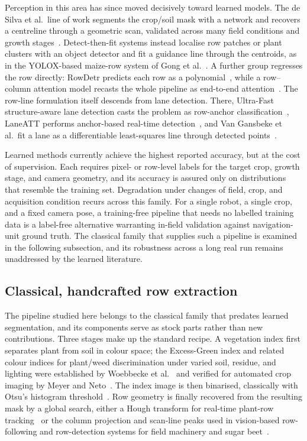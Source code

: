 Perception in this area has since moved decisively toward learned models. The de
Silva et al.\ line of work segments the crop/soil mask with a network and
recovers a centreline through a geometric scan, validated across many field
conditions and growth stages~\cite{cth1,cth2}. Detect-then-fit systems instead
localise row patches or plant clusters with an object detector and fit a
guidance line through the centroids, as in the YOLOX-based maize-row system of
Gong et al.~\cite{diao_yolox}. A further group regresses the row directly:
RowDetr predicts each row as a polynomial~\cite{rowdetr}, while a row--column
attention model recasts the whole pipeline as end-to-end
attention~\cite{rowcolattn}. The row-line formulation itself descends from lane
detection. There, Ultra-Fast structure-aware lane detection casts the problem as
row-anchor classification~\cite{ufld}, LaneATT performs anchor-based real-time
detection~\cite{laneatt}, and Van Gansbeke et al.\ fit a lane as a
differentiable least-squares line through detected points~\cite{vangansbeke}.

Learned methods currently achieve the highest reported accuracy, but at the cost
of supervision. Each requires pixel- or row-level labels for the target crop,
growth stage, and camera geometry, and its accuracy is assured only on
distributions that resemble the training set. Degradation under changes of
field, crop, and acquisition condition recurs across this family. For a single
robot, a single crop, and a fixed camera pose, a training-free pipeline that
needs no labelled training data is a label-free
alternative warranting in-field validation against navigation-unit ground truth.
The classical family that supplies such a pipeline is examined in the following
subsection, and its robustness across a long real run remains unaddressed by the
learned literature.

\subsection{Classical, handcrafted row extraction}
\label{subsec:rw_classical}
The pipeline studied here belongs to the classical family that predates learned
segmentation, and its components serve as stock parts rather than new
contributions. Three stages make up the standard recipe. A vegetation index
first separates plant from soil in colour space; the Excess-Green index and
related colour indices for plant/weed discrimination under varied soil, residue,
and lighting were established by Woebbecke et al.~\cite{woebbecke1995} and
verified for automated crop imaging by Meyer and Neto~\cite{meyer2008}. The
index image is then binarised, classically with Otsu's histogram
threshold~\cite{otsu1979}. Row geometry is finally recovered from the resulting
mask by a global search, either a Hough transform for real-time plant-row
tracking~\cite{marchant1995} or the column projection and scan-line peaks used
in vision-based row-following and row-detection systems for field machinery and
sugar beet~\cite{astrand2005,bakker2008}.

